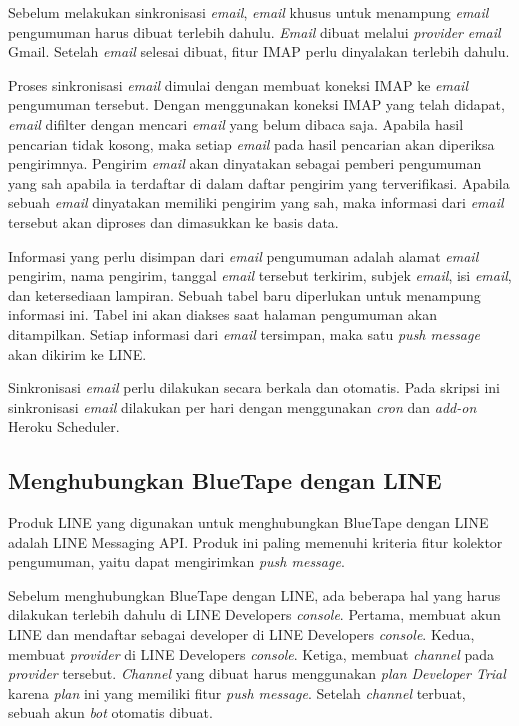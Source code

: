 	Sebelum melakukan sinkronisasi \textit{email}, \textit{email} khusus untuk menampung \textit{email} pengumuman harus dibuat terlebih dahulu. \textit{Email} dibuat melalui \textit{provider} \textit{email} Gmail. Setelah \textit{email} selesai dibuat, fitur IMAP perlu dinyalakan terlebih dahulu.
	
	Proses sinkronisasi \textit{email} dimulai dengan membuat koneksi IMAP ke \textit{email} pengumuman tersebut. Dengan menggunakan koneksi IMAP yang telah didapat, \textit{email} difilter dengan mencari \textit{email} yang belum dibaca saja. Apabila hasil pencarian tidak kosong, maka setiap \textit{email} pada hasil pencarian akan diperiksa pengirimnya. Pengirim \textit{email} akan dinyatakan sebagai pemberi pengumuman yang sah apabila ia terdaftar di dalam daftar pengirim yang terverifikasi. Apabila sebuah \textit{email} dinyatakan memiliki pengirim yang sah, maka informasi dari \textit{email} tersebut akan diproses dan dimasukkan ke basis data.
	
	Informasi yang perlu disimpan dari \textit{email} pengumuman adalah alamat \textit{email} pengirim, nama pengirim, tanggal \textit{email} tersebut terkirim, subjek \textit{email}, isi \textit{email}, dan ketersediaan lampiran. Sebuah tabel baru diperlukan untuk menampung informasi ini. Tabel ini akan diakses saat halaman pengumuman akan ditampilkan. Setiap informasi dari \textit{email} tersimpan, maka satu \textit{push message} akan dikirim ke LINE.
	
	Sinkronisasi \textit{email} perlu dilakukan secara berkala dan otomatis. Pada skripsi ini sinkronisasi \textit{email} dilakukan per hari dengan menggunakan \textit{cron} dan \textit{add-on} Heroku Scheduler.
	
\subsection{Menghubungkan BlueTape dengan LINE}
\label{sec:analisisline}
	Produk LINE yang digunakan untuk menghubungkan BlueTape dengan LINE adalah LINE Messaging API. Produk ini paling memenuhi kriteria fitur kolektor pengumuman, yaitu dapat mengirimkan \textit{push message}.
	
	Sebelum menghubungkan BlueTape dengan LINE, ada beberapa hal yang harus dilakukan terlebih dahulu di LINE Developers \textit{console}. Pertama, membuat akun LINE dan mendaftar sebagai developer di LINE Developers \textit{console}. Kedua, membuat \textit{provider} di LINE Developers \textit{console}. Ketiga, membuat \textit{channel} pada \textit{provider} tersebut. \textit{Channel} yang dibuat harus menggunakan \textit{plan Developer Trial} karena \textit{plan} ini yang memiliki fitur \textit{push message}. Setelah \textit{channel} terbuat, sebuah akun \textit{bot} otomatis dibuat.
	
